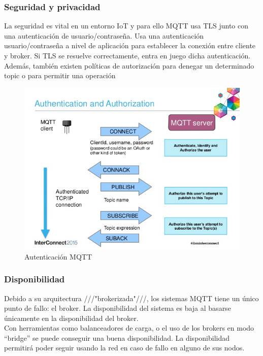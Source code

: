 \documentclass[12pt, twoside]{book}
\begin{document}
\subsubsection*{Seguridad y privacidad}
La seguridad es vital en un entorno IoT y para ello MQTT usa TLS junto con una autenticación de usuario/contraseña. Usa una autenticación usuario/contraseña a nivel de aplicación para establecer la conexión entre cliente y broker. Si TLS se resuelve correctamente, entra en juego dicha autenticación. Además, también existen políticas de autorización para denegar un determinado topic o para permitir una operación
\begin{figure}[h!]
\centering
\includegraphics[scale=0.3]{images/mqtt_ssl}
\caption{Autenticación MQTT}\label{L404}
\end{figure}
\subsubsection*{Disponibilidad}
Debido a su arquitectura ///"brokerizada"///, los sistemas MQTT tiene un único punto de fallo: el broker. La disponibilidad del sistema es baja al basarse únicamente en la disponibilidad del broker. \\
Con herramientas como balanceadores de carga, o el uso de los brokers en modo “bridge” se puede conseguir una buena disponibilidad. La disponibilidad permitirá poder seguir usando la red en caso de fallo en alguno de sus nodos. 
\end{document}

